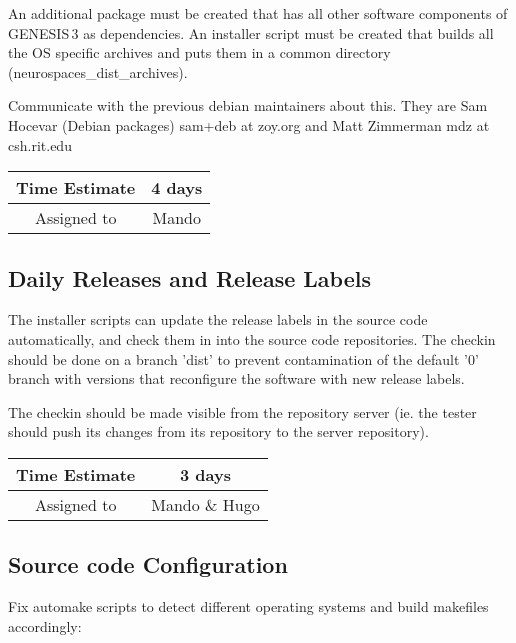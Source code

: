 \documentclass[12pt]{article}
\begin{document}
An additional package must be created that has all other software
components of GENESIS\,3 as dependencies.  An installer script must
be created that builds all the OS specific archives and puts them in a
common directory (neurospaces\_dist\_archives).

Communicate with the previous debian maintainers about this.  They are
Sam Hocevar (Debian packages) sam+deb at zoy.org and Matt Zimmerman
mdz at csh.rit.edu

\begin{center}
  \vspace{5mm}
  \centering
  \begin{tabular}{|c|c|}
    \hline
    Time Estimate
    & 4 days \\
    \hline
    Assigned to
    & Mando \\
    \hline
  \end{tabular}
\end{center}


\subsection{Daily Releases and Release Labels}

The installer scripts can update the release labels in the source code
automatically, and check them in into the source code repositories.
The checkin should be done on a branch 'dist' to prevent contamination
of the default '0' branch with versions that reconfigure the software
with new release labels.

The checkin should be made visible from the repository server (ie. the
tester should push its changes from its repository to the server
repository).

\begin{center}
  \vspace{5mm}
  \centering
  \begin{tabular}{|c|c|}
    \hline
    Time Estimate
    & 3 days \\
    \hline
    Assigned to
    & Mando \& Hugo \\
    \hline
  \end{tabular}
\end{center}


\subsection{Source code Configuration}

Fix automake scripts to detect different operating systems 
and build makefiles accordingly:
\end{document}
